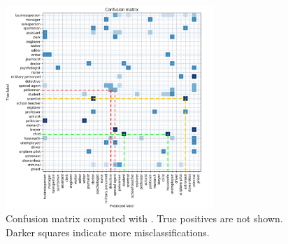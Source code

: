\begin{figure}[t]
\centering
\includegraphics[width=0.7\textwidth]{pics/conf_new.png}
\vspace*{-0.3cm}
\caption{Confusion matrix computed with . True positives are not shown. Darker squares indicate more misclassifications.}
\label{matrix}
\end{figure}



%


